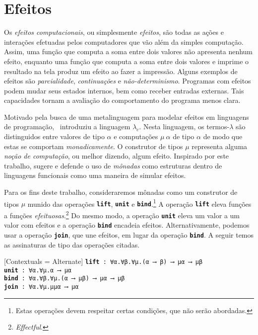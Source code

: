 \section{Efeitos}

Os \emph{efeitos computacionais}, ou simplesmente \emph{efeitos}, são todas as ações e interações efetuadas pelos computadores que vão além da simples computação.
Assim, uma função que computa a soma entre dois valores não apresenta nenhum efeito, enquanto uma função que computa a soma entre dois valores e imprime o resultado na tela produz um efeito ao fazer a impressão.
Alguns exemplos de efeitos são \emph{parcialidade}, \emph{continuações} e \emph{não-determinismo}.
Programas com efeitos podem mudar seus estados internos, bem como receber entradas externas.
Tais capacidades tornam a avaliação do comportamento do programa menos clara.

\vspace{.5\baselineskip}
Motivado pela busca de uma metalinguagem para modelar efeitos em linguagens de programação,~\cite{Moggi.1991} introduziu a linguagem $\lambda_c$.
Nesta linguagem, os termos-$\lambda$ são distinguidos entre valores de tipo $\alpha$ e computações $\mu\ \alpha$ de tipo $\alpha$ de modo que estas se comportam \emph{monadicamente}.
O construtor de tipos $\mu$ representa alguma \emph{noção de computação}, ou melhor dizendo, algum efeito.
Inspirado por este trabalho, \cite{Wadler.1993} sugere e defende o uso de \emph{mônadas} como estruturas dentro de linguagens funcionais como uma maneira de simular efeitos.

\vspace{.5\baselineskip}
Para os fins deste trabalho, consideraremos mônadas como um construtor de tipos $\mu$ munido das operações {\texttt{\textbf{lift}}}, {\texttt{\textbf{unit}}} e {\texttt{\textbf{bind}}}.\footnote{Estas operações devem respeitar certas condições, que não serão abordadas.}
A operação {\texttt{\textbf{lift}}} eleva funções a funções \emph{efeituosas}.\footnote{\emph{Effectful}.}
Do mesmo modo, a operação {\texttt{\textbf{unit}}} eleva um valor a um valor com efeitos e a operação {\texttt{\textbf{bind}}} encadeia efeitos.
Alternativamente, podemos usar a operação {\texttt{\textbf{join}}}, que une efeitos, em lugar da operação {\texttt{\textbf{bind}}}.
A seguir temos as assinaturas de tipo das operações citadas.

\vspace{.5\baselineskip}
\begin{tcolorbox}[enhanced jigsaw, breakable, sharp corners, colframe=black, colback=white, boxrule=0.5pt, left=1.5mm, right=1.5mm, top=1.5mm, bottom=1.5mm]
    \setmonofont{Fira Code}[Contextuals = Alternate]
    \texttt{\footnotesize\textbf{lift} : ∀α.∀β.∀μ.(α ⟶ β) ⟶ μα ⟶ μβ}\\
    \texttt{\footnotesize\textbf{unit} : ∀α.∀μ.α ⟶ μα}\\
    \texttt{\footnotesize\textbf{bind} : ∀α.∀β.∀μ.(α ⟶ μβ) ⟶ μα ⟶ μβ}\\
        \texttt{\footnotesize\textbf{join} : ∀α.∀μ.μμα ⟶ μα}
\end{tcolorbox}

